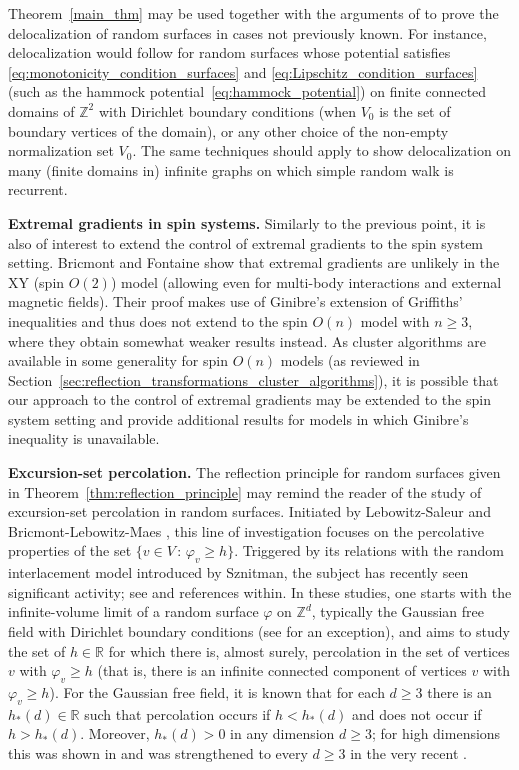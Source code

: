 \documentclass[english]{article}
\theoremstyle{plain}
\theoremstyle{plain}
\begin{document}
Theorem~\ref{main_thm} may be used together with the arguments of \cite{milos2015delocalization} to prove the delocalization of random surfaces in cases not previously known. For instance, delocalization would follow for random surfaces whose potential satisfies \eqref{eq:monotonicity_condition_surfaces} and
\eqref{eq:Lipschitz_condition_surfaces} (such as the hammock potential~\eqref{eq:hammock_potential}) on finite connected domains of $\mathbb{Z}^2$ with Dirichlet boundary conditions (when $V_0$ is the set of boundary vertices of the domain), or any other choice of the non-empty normalization set $V_0$. The same techniques should apply to show delocalization on many (finite domains in) infinite graphs on which simple random walk is recurrent.

{\bf Extremal gradients in spin systems.} Similarly to the previous point, it is also of interest to extend the control of extremal gradients to the spin system setting. Bricmont and Fontaine \cite{bricmont1981correlation} show that extremal gradients are unlikely in the XY (spin $O(2)$) model (allowing even for multi-body interactions and external magnetic fields). Their proof makes use of Ginibre's extension of Griffiths' inequalities \cite{Gri67, Gin70} and thus does not extend to the spin $O(n)$ model with $n\ge 3$, where they obtain somewhat weaker results instead. As cluster algorithms are available in some generality for spin $O(n)$ models (as reviewed in Section~\ref{sec:reflection_transformations_cluster_algorithms}), it is possible that our approach to the control of extremal gradients may be extended to the spin system setting and provide additional results for models in which Ginibre's inequality is unavailable.

{\bf Excursion-set percolation.}
The reflection principle for random surfaces given in Theorem~\ref{thm:reflection_principle} may remind the reader of the study of excursion-set
percolation in random surfaces. Initiated by Lebowitz-Saleur \cite{lebowitz1986percolation}
and Bricmont-Lebowitz-Maes \cite{bricmont1987percolation}, this line of investigation focuses
on the percolative properties of the set $\{v\in V\,:\, \varphi_v\ge
h\}$. Triggered by its relations with the random interlacement model
\cite{sznitman2010vacant, rodriguez2013phase} introduced by Sznitman, the subject has recently seen significant activity; see \cite{Drewitz2017}
and references within. In these studies, one starts with the infinite-volume limit of a random surface $\varphi$ on $\mathbb{Z}^d$, typically the Gaussian free field with Dirichlet boundary conditions (see \cite{bricmont1987percolation, rodriguez2016decoupling} for an exception), and aims to study the set of $h\in\mathbb{R}$ for which there is, almost surely, percolation in the set of vertices $v$ with $\varphi_v\ge h$ (that is, there is an infinite connected component of vertices $v$ with $\varphi_v\ge h$). For the Gaussian free field, it is known \cite{bricmont1987percolation, rodriguez2013phase} that for each $d\ge 3$ there is an $h_*(d)\in\mathbb{R}$ such that percolation occurs if $h<h_*(d)$ and does not occur if $h>h_*(d)$. Moreover, $h_*(d)>0$ in any dimension $d\ge 3$; for high dimensions this was shown in \cite{rodriguez2013phase} and was strengthened to every $d\ge 3$ in the very recent \cite{Drewitz2017}.
\end{document}
